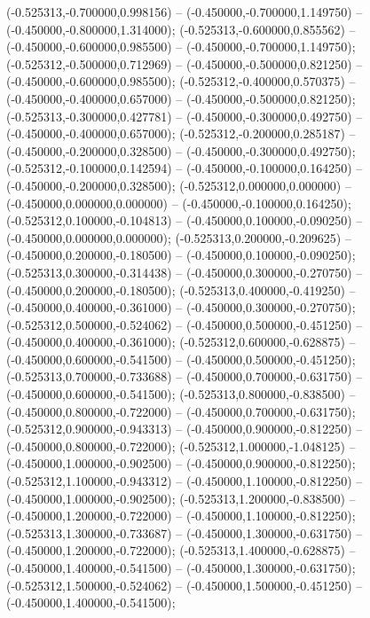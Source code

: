  (-0.525313,-0.700000,0.998156) -- (-0.450000,-0.700000,1.149750) -- (-0.450000,-0.800000,1.314000);
 (-0.525313,-0.600000,0.855562) -- (-0.450000,-0.600000,0.985500) -- (-0.450000,-0.700000,1.149750);
 (-0.525312,-0.500000,0.712969) -- (-0.450000,-0.500000,0.821250) -- (-0.450000,-0.600000,0.985500);
 (-0.525312,-0.400000,0.570375) -- (-0.450000,-0.400000,0.657000) -- (-0.450000,-0.500000,0.821250);
 (-0.525313,-0.300000,0.427781) -- (-0.450000,-0.300000,0.492750) -- (-0.450000,-0.400000,0.657000);
 (-0.525312,-0.200000,0.285187) -- (-0.450000,-0.200000,0.328500) -- (-0.450000,-0.300000,0.492750);
 (-0.525312,-0.100000,0.142594) -- (-0.450000,-0.100000,0.164250) -- (-0.450000,-0.200000,0.328500);
 (-0.525312,0.000000,0.000000) -- (-0.450000,0.000000,0.000000) -- (-0.450000,-0.100000,0.164250);
 (-0.525312,0.100000,-0.104813) -- (-0.450000,0.100000,-0.090250) -- (-0.450000,0.000000,0.000000);
 (-0.525313,0.200000,-0.209625) -- (-0.450000,0.200000,-0.180500) -- (-0.450000,0.100000,-0.090250);
 (-0.525313,0.300000,-0.314438) -- (-0.450000,0.300000,-0.270750) -- (-0.450000,0.200000,-0.180500);
 (-0.525313,0.400000,-0.419250) -- (-0.450000,0.400000,-0.361000) -- (-0.450000,0.300000,-0.270750);
 (-0.525312,0.500000,-0.524062) -- (-0.450000,0.500000,-0.451250) -- (-0.450000,0.400000,-0.361000);
 (-0.525312,0.600000,-0.628875) -- (-0.450000,0.600000,-0.541500) -- (-0.450000,0.500000,-0.451250);
 (-0.525313,0.700000,-0.733688) -- (-0.450000,0.700000,-0.631750) -- (-0.450000,0.600000,-0.541500);
 (-0.525313,0.800000,-0.838500) -- (-0.450000,0.800000,-0.722000) -- (-0.450000,0.700000,-0.631750);
 (-0.525312,0.900000,-0.943313) -- (-0.450000,0.900000,-0.812250) -- (-0.450000,0.800000,-0.722000);
 (-0.525312,1.000000,-1.048125) -- (-0.450000,1.000000,-0.902500) -- (-0.450000,0.900000,-0.812250);
 (-0.525312,1.100000,-0.943312) -- (-0.450000,1.100000,-0.812250) -- (-0.450000,1.000000,-0.902500);
 (-0.525313,1.200000,-0.838500) -- (-0.450000,1.200000,-0.722000) -- (-0.450000,1.100000,-0.812250);
 (-0.525313,1.300000,-0.733687) -- (-0.450000,1.300000,-0.631750) -- (-0.450000,1.200000,-0.722000);
 (-0.525313,1.400000,-0.628875) -- (-0.450000,1.400000,-0.541500) -- (-0.450000,1.300000,-0.631750);
 (-0.525312,1.500000,-0.524062) -- (-0.450000,1.500000,-0.451250) -- (-0.450000,1.400000,-0.541500);
